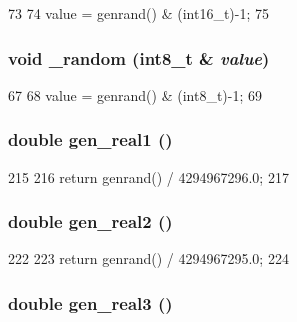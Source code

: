 \begin{DoxyCode}
73     {
74         value = genrand() & (int16_t)-1;
75     }
\end{DoxyCode}
\hypertarget{classRandom_ac25bad8f8a49119c66d15434d0e6f7a4}{
\subsubsection[{\_\-random}]{\setlength{\rightskip}{0pt plus 5cm}void \_\-random (int8\_\-t \& {\em value})}}
\label{classRandom_ac25bad8f8a49119c66d15434d0e6f7a4}



\begin{DoxyCode}
67     {
68         value = genrand() & (int8_t)-1;
69     }
\end{DoxyCode}
\hypertarget{classRandom_a495fb8d7ce08a0109503ad1d078c6a05}{
\subsubsection[{gen\_\-real1}]{\setlength{\rightskip}{0pt plus 5cm}double gen\_\-real1 ()}}
\label{classRandom_a495fb8d7ce08a0109503ad1d078c6a05}



\begin{DoxyCode}
215     {
216         return genrand() / 4294967296.0;
217     }
\end{DoxyCode}
\hypertarget{classRandom_a3f719fa0f7eb19ec2ec2322d85622aaa}{
\subsubsection[{gen\_\-real2}]{\setlength{\rightskip}{0pt plus 5cm}double gen\_\-real2 ()}}
\label{classRandom_a3f719fa0f7eb19ec2ec2322d85622aaa}



\begin{DoxyCode}
222     {
223         return genrand() / 4294967295.0;
224     }
\end{DoxyCode}
\hypertarget{classRandom_aa84077a23487af5be5e8c5d46b6d08b9}{
\subsubsection[{gen\_\-real3}]{\setlength{\rightskip}{0pt plus 5cm}double gen\_\-real3 ()}}
\label{classRandom_aa84077a23487af5be5e8c5d46b6d08b9}



